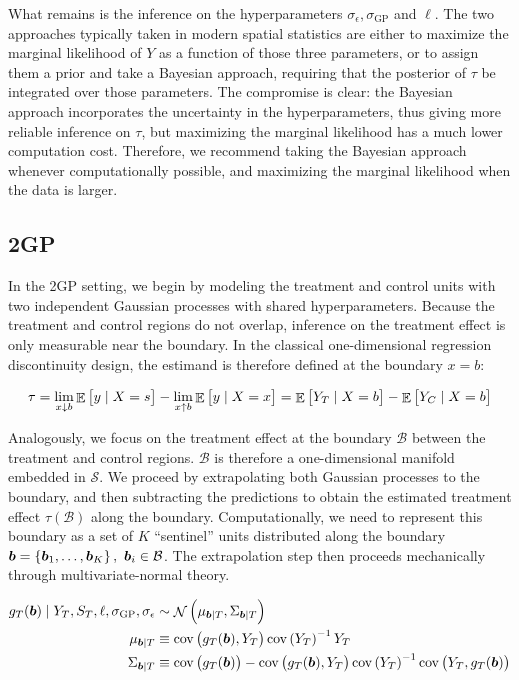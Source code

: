 \documentclass[letter]{article}
\DeclareMathOperator{\E}{\mathbb{E}}
\DeclareMathOperator{\cov}{{cov}}
\DeclareMathOperator{\normal}{\mathcal{N}}
\newcommand{\scrS}{\mathscr{S}}
\newcommand{\sigmaf}{\sigma_{\mathrm{GP}}}
\newcommand{\sigman}{\sigma_{\epsilon}}
\newcommand{\boundary}{\mathcal{B}}
\newcommand{\sentinels}{\bm{b}}
\begin{document}
What remains is the inference on the hyperparameters \(\sigman, \sigmaf\) and \(\ell\). The two approaches typically taken in modern spatial statistics are either to maximize the marginal likelihood of \(Y\) as a function of those three parameters, or to assign them a prior and take a Bayesian approach, requiring that the posterior of \(\tau\) be integrated over those parameters. The compromise is clear: the Bayesian approach incorporates the uncertainty in the hyperparameters, thus giving more reliable inference on \(\tau\), but maximizing the marginal likelihood has a much lower computation cost. Therefore, we recommend taking the Bayesian approach whenever computationally possible, and maximizing the marginal likelihood when the data is larger.
    


    	\subsection{2GP}\label{gp}

In the 2GP setting, we begin by modeling the treatment and control units with two independent Gaussian processes with shared hyperparameters. Because the treatment and control regions do not overlap, inference on the treatment effect is only measurable near the boundary. In the classical one-dimensional regression discontinuity design, the estimand is therefore defined at the boundary \(x=b\):

\begin{equation}
\tau = \lim_{x \downarrow b} \E\sbr{y \mid X=s} - \lim_{x \uparrow b} \E\sbr{y \mid X=x} = \E\sbr{Y_T \mid X=b} - \E\sbr{Y_C \mid X=b}
\end{equation}

Analogously, we focus on the treatment effect at the boundary \(\boundary\) between the treatment and control regions. \(\boundary\) is therefore a one-dimensional manifold embedded in \(\scrS\).
We proceed by extrapolating both Gaussian processes to the boundary,
and then subtracting the predictions to obtain the estimated treatment effect \(\tau(\boundary)\) along the boundary.
Computationally, we need to represent this boundary as a set of \(K\) ``sentinel'' units distributed along the boundary \(\sentinels=\cbr{\sentinels_1,\ldots,\sentinels_K},~\sentinels_i \in \boundary\).
The extrapolation step then proceeds mechanically through multivariate-normal theory.

\begin{equation}\begin{split}
    g_T(\sentinels) \mid Y_T, S_T, \ell, \sigmaf, \sigman &\sim \normal\del{\mu_{\sentinels \mid T}, \Sigma_{\sentinels \mid T}} \\
    \mu_{\sentinels \mid T} &\equiv \cov\del{g_T(\sentinels), Y_T} \cov\del{Y_T}^{-1}  Y_T \\
    \Sigma_{\sentinels \mid T} &\equiv \cov \del{g_T(\sentinels)} - \cov\del{g_T(\sentinels), Y_T} \cov\del{Y_T}^{-1} \cov\del{Y_T,g_T(\sentinels) \label{eq:postvarT2gp}
    }
\end{split}\end{equation}
\end{document}
